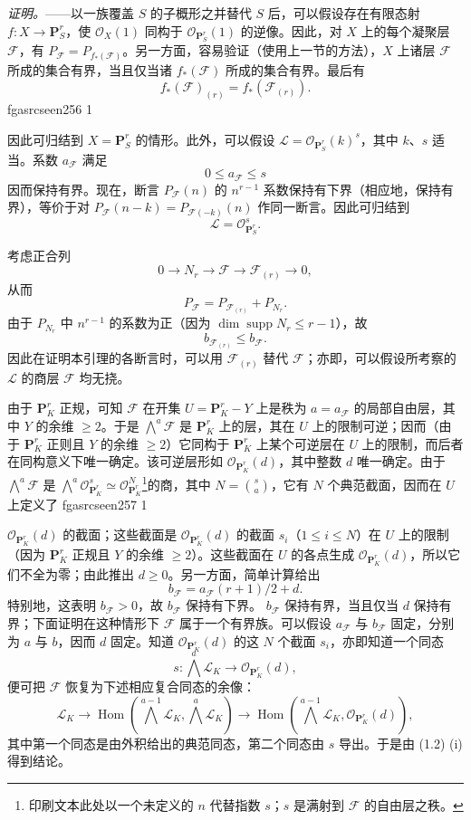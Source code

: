 \documentclass[12pt,twoside,openany]{book}
\numberwithin{equation}{section}
\newcommand{\fgaunitid}{unbound}
\newcommand{\src}[1]{%
  \phantomsection
  \hypertarget{src:\fgaunitid:#1}{}%
  \hypertarget{fga.\fgaunitid.p#1}{}%
  \ifcsname fgasrcseen#1\endcsname\else
    \expandafter\gdef\csname fgasrcseen#1\endcsname{1}%
    \hypertarget{src:#1}{}%
  \fi
  \marginpar{\raggedleft\footnotesize\sffamily #1}%
}
\theoremstyle{plain}
\theoremstyle{definition}
\theoremstyle{remark}
\begin{document}
\emph{证明。}——以一族覆盖 $S$ 的子概形之并替代 $S$ 后，可以假设存在有限态射
$f:X\longrightarrow\mathbf P^r_S$，使 $\mathcal O_X(1)$ 同构于
$\mathcal O_{\mathbf P^r_S}(1)$ 的逆像。因此，对 $X$ 上的每个凝聚层
$\mathcal F$，有
$P_{\mathcal F}=P_{f_*(\mathcal F)}$。另一方面，容易验证（使用上一节的方法），$X$ 上诸层 $\mathcal F$ 所成的集合有界，当且仅当诸
$f_*(\mathcal F)$ 所成的集合有界。最后有
\[
f_*(\mathcal F)_{(r)}=f_*(\mathcal F_{(r)}).
\]
\src{256}
因此可归结到 $X=\mathbf P^r_S$ 的情形。此外，可以假设
$\mathcal L=\mathcal O_{\mathbf P^r_S}(k)^s$，其中 $k$、$s$ 适当。系数
$a_{\mathcal F}$ 满足
\[
0\leq a_{\mathcal F}\leq s
\]
因而保持有界。现在，断言 $P_{\mathcal F}(n)$ 的 $n^{r-1}$ 系数保持有下界（相应地，保持有界），等价于对
$P_{\mathcal F}(n-k)=P_{\mathcal F(-k)}(n)$ 作同一断言。因此可归结到
\[
\mathcal L=\mathcal O_{\mathbf P^r_S}^{s}.
\]

考虑正合列
\[
0\longrightarrow N_r\longrightarrow\mathcal F
\longrightarrow\mathcal F_{(r)}\longrightarrow0,
\]
从而
\[
P_{\mathcal F}=P_{\mathcal F_{(r)}}+P_{N_r}.
\]
由于 $P_{N_r}$ 中 $n^{r-1}$ 的系数为正（因为
$\dim\operatorname{supp}N_r\leq r-1$），故
\[
b_{\mathcal F_{(r)}}\leq b_{\mathcal F}.
\]
因此在证明本引理的各断言时，可以用 $\mathcal F_{(r)}$ 替代
$\mathcal F$；亦即，可以假设所考察的 $\mathcal L$ 的商层
$\mathcal F$ 均无挠。

由于 $\mathbf P^r_K$ 正规，可知 $\mathcal F$ 在开集
$U=\mathbf P^r_K-Y$ 上是秩为 $a=a_{\mathcal F}$ 的局部自由层，其中
$Y$ 的余维 $\geq2$。于是 $\bigwedge^a\mathcal F$ 是
$\mathbf P^r_K$ 上的层，其在 $U$ 上的限制可逆；因而（由于
$\mathbf P^r_K$ 正则且 $Y$ 的余维 $\geq2$）它同构于
$\mathbf P^r_K$ 上某个可逆层在 $U$ 上的限制，而后者在同构意义下唯一确定。该可逆层形如
$\mathcal O_{\mathbf P^r_K}(d)$，其中整数 $d$ 唯一确定。由于
$\bigwedge^a\mathcal F$ 是
$\bigwedge^a\mathcal O_{\mathbf P^r_K}^{s}\simeq
\mathcal O_{\mathbf P^r_K}^{N}$\footnote{印刷文本此处以一个未定义的
$n$ 代替指数 $s$；$s$ 是满射到 $\mathcal F$ 的自由层之秩。}的商，其中
$N=\binom{s}{a}$，它有 $N$ 个典范截面，因而在 $U$ 上定义了
\src{257}
$\mathcal O_{\mathbf P^r_K}(d)$ 的截面；这些截面是
$\mathcal O_{\mathbf P^r_K}(d)$ 的截面 $s_i$（$1\leq i\leq N$）在
$U$ 上的限制（因为 $\mathbf P^r_K$ 正规且 $Y$ 的余维 $\geq2$）。这些截面在 $U$ 的各点生成
$\mathcal O_{\mathbf P^r_K}(d)$，所以它们不全为零；由此推出
$d\geq0$。另一方面，简单计算给出
\[
b_{\mathcal F}=a_{\mathcal F}(r+1)/2+d.
\]
特别地，这表明 $b_{\mathcal F}>0$，故 $b_{\mathcal F}$ 保持有下界。
$b_{\mathcal F}$ 保持有界，当且仅当 $d$ 保持有界；下面证明在这种情形下 $\mathcal F$ 属于一个有界族。可以假设
$a_{\mathcal F}$ 与 $b_{\mathcal F}$ 固定，分别为 $a$ 与 $b$，因而
$d$ 固定。知道 $\mathcal O_{\mathbf P^r_K}(d)$ 的这 $N$ 个截面
$s_i$，亦即知道一个同态
\[
s:\bigwedge^a\mathcal L_K\longrightarrow\mathcal O_{\mathbf P^r_K}(d),
\]
便可把 $\mathcal F$ 恢复为下述相应复合同态的余像：
\[
\mathcal L_K\longrightarrow
\operatorname{Hom}\!\left(\bigwedge^{a-1}\mathcal L_K,
\bigwedge^a\mathcal L_K\right)\longrightarrow
\operatorname{Hom}\!\left(\bigwedge^{a-1}\mathcal L_K,
\mathcal O_{\mathbf P^r_K}(d)\right),
\]
其中第一个同态是由外积给出的典范同态，第二个同态由 $s$ 导出。于是由
(1.2) (i) 得到结论。
\end{document}
